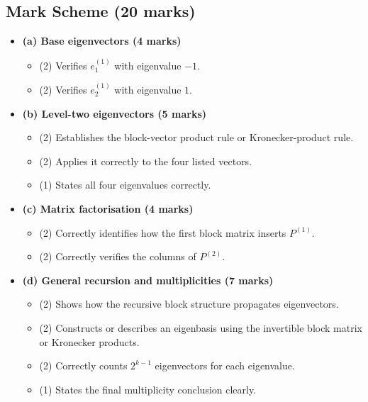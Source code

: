 \documentclass[12pt]{article}
\begin{document}
\newpage
\subsection{Mark Scheme (20 marks)}
\begin{itemize}[leftmargin=1.6em]
  \item \textbf{(a) Base eigenvectors (4 marks)}
  \begin{itemize}[leftmargin=1.6em]
    \item (2) Verifies $e_1^{(1)}$ with eigenvalue $-1$.
    \item (2) Verifies $e_2^{(1)}$ with eigenvalue $1$.
  \end{itemize}
  \item \textbf{(b) Level-two eigenvectors (5 marks)}
  \begin{itemize}[leftmargin=1.6em]
    \item (2) Establishes the block-vector product rule or Kronecker-product rule.
    \item (2) Applies it correctly to the four listed vectors.
    \item (1) States all four eigenvalues correctly.
  \end{itemize}
  \item \textbf{(c) Matrix factorisation (4 marks)}
  \begin{itemize}[leftmargin=1.6em]
    \item (2) Correctly identifies how the first block matrix inserts $P^{(1)}$.
    \item (2) Correctly verifies the columns of $P^{(2)}$.
  \end{itemize}
  \item \textbf{(d) General recursion and multiplicities (7 marks)}
  \begin{itemize}[leftmargin=1.6em]
    \item (2) Shows how the recursive block structure propagates eigenvectors.
    \item (2) Constructs or describes an eigenbasis using the invertible block matrix or Kronecker products.
    \item (2) Correctly counts $2^{k-1}$ eigenvectors for each eigenvalue.
    \item (1) States the final multiplicity conclusion clearly.
  \end{itemize}
\end{itemize}
\end{document}
